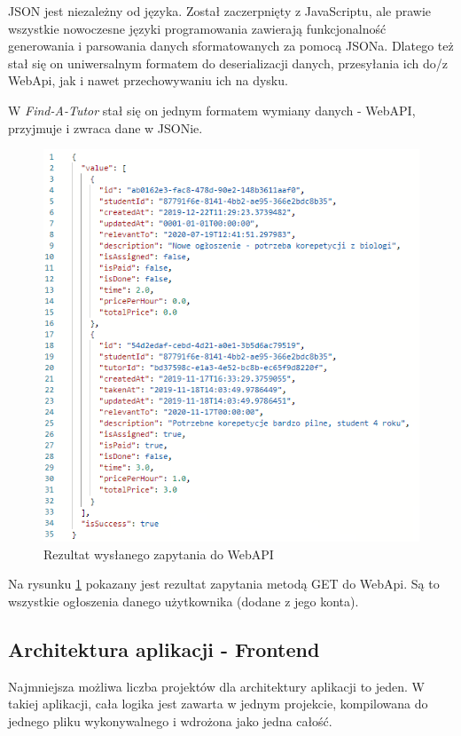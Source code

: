 \documentclass[12pt]{article}
\numberwithin{figure}{section}
\begin{document}
\begin{sloppypar}
        JSON jest niezależny od języka. Został zaczerpnięty z JavaScriptu, ale prawie wszystkie nowoczesne języki programowania zawierają funkcjonalność generowania i parsowania danych sformatowanych za pomocą JSONa. Dlatego też stał się on uniwersalnym formatem do deserializacji danych, przesyłania ich do/z WebApi, jak i nawet przechowywaniu ich na dysku.
        
        W \textit{Find-A-Tutor} stał się on jednym formatem wymiany danych - WebAPI, przyjmuje i zwraca dane w JSONie. 
        
        \begin{figure}[H] 
         	\centering
        	\includegraphics[width=.8\textwidth]{images/chapter_3/json-get.png}
        	\caption{Rezultat wysłanego zapytania do WebAPI}
        	\label{fig:json-get}
        \end{figure}
        
        Na rysunku \ref{fig:json-get} pokazany jest rezultat zapytania metodą GET do WebApi. Są to wszystkie ogłoszenia danego użytkownika (dodane z jego konta).
        
\subsection{Architektura aplikacji - Frontend}
Najmniejsza możliwa liczba projektów dla architektury aplikacji to jeden. W takiej aplikacji, cała logika jest zawarta w jednym projekcie, kompilowana do jednego pliku wykonywalnego i wdrożona jako jedna całość. 
    

\end{sloppypar}
\end{document}
